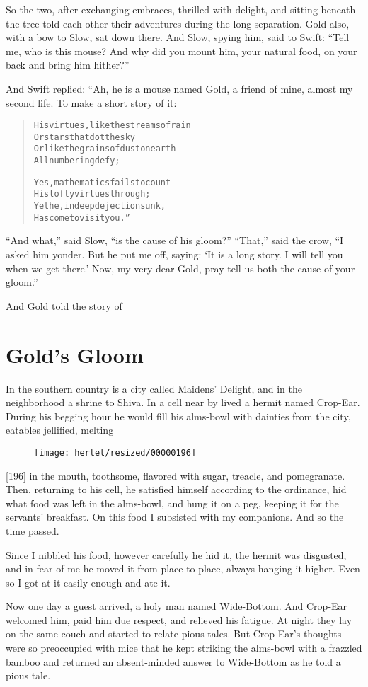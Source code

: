 \documentclass[article, twoside, 10pt]{memoir}
\renewenvironment{verbatim}{%
\begin{quote}%
\vskip -10pt%
\begin{alltt}\normalfont\small}{\end{alltt}%
\end{quote}%
\vskip -10pt
} %
\begin{document}
So the two, after exchanging embraces, thrilled with delight, and
sitting beneath the tree told each other their adventures during
the long separation. Gold also, with a bow to Slow, sat down there.
And Slow, spying him, said to Swift:
``Tell me, who is this mouse? And why did you mount him, your natural food, on your back and bring him hither?''

And Swift replied: “Ah, he is a mouse named Gold, a friend of mine,
almost my second life. To make a short story of it:

\begin{verbatim}
His virtues, like the streams of rain
    Or stars that dot the sky
Or like the grains of dust on earth
    All numbering defy;

Yes, mathematics fails to count
    His lofty virtues through;
Yet he, in deep dejection sunk,
    Has come to visit you.”
\end{verbatim}
``And what,'' said Slow, ``is the cause of his gloom?'' ``That,''
said the crow,
``I asked him yonder. But he put me off, saying: `It is a long story. I will tell you when we get there.' Now, my very dear Gold, pray tell us both the cause of your gloom.''

And Gold told the story of

\chapter{Gold's Gloom}

In the southern country is a city called Maidens' Delight, and in
the neighborhood a shrine to Shiva. In a cell near by lived a
hermit named Crop-Ear. During his begging hour he would fill his
alms-bowl with dainties from the city, eatables jellified, melting
\begin{figure}[p]\texttt{[image: hertel/resized/00000196]}\end{figure}[196] in the mouth, toothsome, flavored with sugar, treacle, and
pomegranate. Then, returning to his cell, he satisfied himself
according to the ordinance, hid what food was left in the
alms-bowl, and hung it on a peg, keeping it for the servants'
breakfast. On this food I subsisted with my companions. And so the
time passed.

Since I nibbled his food, however carefully he hid it, the hermit
was disgusted, and in fear of me he moved it from place to place,
always hanging it higher. Even so I got at it easily enough and ate
it.

Now one day a guest arrived, a holy man named Wide-Bottom. And
Crop-Ear welcomed him, paid him due respect, and relieved his
fatigue. At night they lay on the same couch and started to relate
pious tales. But Crop-Ear's thoughts were so preoccupied with mice
that he kept striking the alms-bowl with a frazzled bamboo and
returned an absent-minded answer to Wide-Bottom as he told a pious
tale.
\end{document}
